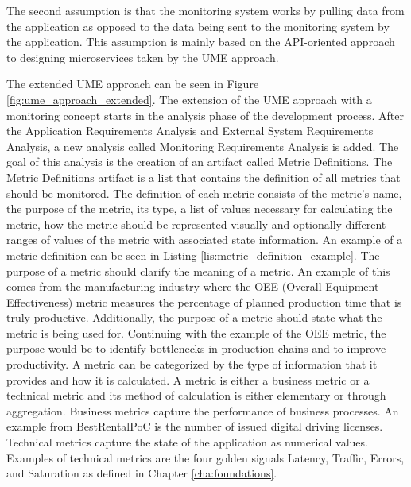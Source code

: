 The second assumption is that the monitoring system works by pulling data from the application
as opposed to the data being sent to the monitoring system by the application. This assumption
is mainly based on the API-oriented approach to designing microservices taken by the UME approach.


The extended UME approach can be seen in Figure \ref{fig:ume_approach_extended}.
The extension of the UME approach with a monitoring concept starts in the analysis phase
of the development process. After the Application Requirements Analysis and External System Requirements Analysis,
a new analysis called Monitoring Requirements Analysis is added. The goal of this analysis
is the creation of an artifact called Metric Definitions. The Metric Definitions artifact is a list
that contains the definition of all metrics that should be monitored.
The definition of each metric consists of the metric's name, the purpose of the metric,
its type, a list of values necessary for calculating the metric, how the metric should
be represented visually and optionally different ranges of values of the metric with associated
state information. An example of a metric definition can be seen in Listing \ref{lis:metric_definition_example}.
The purpose of a metric should clarify the meaning of a metric.
An example of this comes from the manufacturing industry where the OEE (Overall Equipment Effectiveness)
metric measures the percentage of planned production time that is truly productive.
Additionally, the purpose of a metric should state what the metric is being used for.
Continuing with the example of the OEE metric, the purpose would be to identify bottlenecks
in production chains and to improve productivity.
A metric can be categorized by the type of information that it provides and how it is calculated.
A metric is either a business metric or a technical metric and its method of calculation is either
elementary or through aggregation.
Business metrics capture the performance of business processes.
An example from BestRentalPoC is the number of issued digital driving licenses.
Technical metrics capture the state of the application as numerical values.
Examples of technical metrics are the four golden signals Latency, Traffic, Errors, and Saturation
as defined in Chapter \ref{cha:foundations}.
